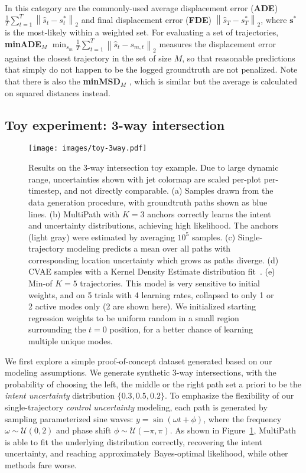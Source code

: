 \documentclass{article}
\newcommand{\multiflow}{MultiPath\xspace}
\begin{document}
 In this category are the commonly-used average displacement error ({\bf ADE}) $\frac{1}{T} \sum_{t=1}^T \left \| \hat{s}_t - s^*_t \right \| _2$ and final displacement error ({\bf FDE}) $\left \| \hat{s}_T - s^*_T \right \| _2$,  where $\mathbf{s}^*$ is the most-likely within a weighted set. For evaluating a set of trajectories, {\bf minADE$_M$} $\min_{s_m} \frac{1}{T} \sum_{t=1}^T \left \| \hat{s}_t - s_{m, t} \right \| _2$ measures the displacement error against the closest trajectory in the set of size $M$, so that reasonable predictions that simply do not happen to be the logged groundtruth are not penalized. Note that there is also the {\bf minMSD$_M$} \cite{Rhinehart18}, which is similar but the average is calculated on squared distances instead.



\subsection{Toy experiment: 3-way intersection}
\label{sec:toy}

\begin{figure}[!tbp]
\centering
\texttt{[image: images/toy-3way.pdf]}
\caption{\small Results on the 3-way intersection toy example. Due to large dynamic range, uncertainties shown with jet colormap are scaled per-plot per-timestep, and not directly comparable. (a) Samples drawn from the data generation procedure, with groundtruth paths shown as blue lines. (b) \multiflow with $K=3$ anchors correctly learns the intent and uncertainty distributions, achieving high likelihood. The anchors (light gray) were estimated by averaging $10^5$ samples. (c) Single-trajectory modeling predicts a mean over all paths with corresponding location uncertainty which grows as paths diverge. (d) CVAE samples with a Kernel Density Estimate distribution fit~\cite{Bishop06}. (e) Min-of $K=5$ trajectories.  This model is very sensitive to initial weights, and on 5 trials with 4 learning rates, collapsed to only 1 or 2 active modes only (2 are shown here).  We initialized starting regression weights to be uniform random in a small region surrounding the $t=0$ position, for a better chance of learning multiple unique modes.
\vspace{-0.2cm}}
\label{fig:toy-3way}
\end{figure}

We first explore a simple proof-of-concept dataset generated based on our modeling assumptions.  We generate synthetic 3-way intersections, with the probability of choosing the left, the middle or the right path set a priori to be the {\em intent uncertainty} distribution  $\{0.3, 0.5, 0.2\}$. To emphasize the flexibility of our single-trajectory {\em control uncertainty} modeling, each path is generated by sampling parameterized sine waves: $y = \sin(\omega t + \phi)$, where the frequency $\omega \sim \mathcal{U}(0,2)$ and phase shift $\phi \sim \mathcal{U}(-\pi, \pi)$.  As shown in Figure~\ref{fig:toy-3way}, \multiflow is able to fit the underlying distribution correctly, recovering the intent uncertainty, and reaching approximately Bayes-optimal likelihood, while other methods fare worse.
\end{document}
